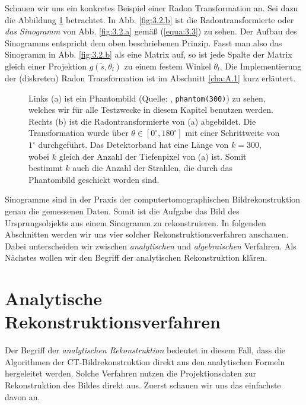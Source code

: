 Schauen wir uns ein konkretes Beispiel einer Radon Transformation an. Sei dazu die Abbildung \ref{fig:3.2} betrachtet. In Abb. \ref{fig:3.2.b} ist die Radontransformierte oder \textit{das Sinogramm} von Abb. \ref{fig:3.2.a} gemäß (\ref{equa:3.3}) zu sehen. Der Aufbau des Sinogramms entspricht dem oben beschriebenen Prinzip. Fasst man also das Sinogramm in Abb. \ref{fig:3.2.b} als eine Matrix auf, so ist jede Spalte der Matrix gleich einer Projektion $g(\tilde{s}, \theta_l)$ zu einem festem Winkel $\theta_l$. Die Implementierung der (diskreten) Radon Transformation ist im Abschnitt \ref{cha:A.1} kurz erläutert.
\begin{figure}[H]
	\begin{center}
	\end{center}
	\caption{ Links (a) ist ein Phantombild (Quelle: \MATLAB, \texttt{\captionstring phantom(300)}) zu sehen, welches wir für alle Testzwecke in diesem Kapitel benutzen werden. Rechts (b) ist die Radontransformierte von (a) abgebildet. Die Transformation wurde über $\theta \in [0^{\circ}, 180^{\circ}]$ mit einer Schrittweite von $1^{\circ}$ durchgeführt. Das Detektorband hat eine Länge von $k = 300$, wobei $k$ gleich der Anzahl der Tiefenpixel von (a) ist. Somit bestimmt $k$ auch die Anzahl der Strahlen, die durch das Phantombild geschickt worden sind.}
	\label{fig:3.2}
\end{figure}

Sinogramme sind in der Praxis der computertomographischen Bildrekonstruktion genau die gemessenen Daten. Somit ist die Aufgabe das Bild des Ursprungsobjekts aus einem Sinogramm zu rekonstruieren. In folgenden Abschnitten werden wir uns vier solcher Rekonstruktionsverfahren anschauen. Dabei unterscheiden wir zwischen \textit{analytischen} und \textit{algebraischen} Verfahren. Als Nächstes wollen wir den Begriff der analytischen Rekonstruktion klären.

\section{Analytische Rekonstruktionsverfahren}
\label{cha:3.1}

Der Begriff der \textit{analytischen Rekonstruktion} bedeutet in diesem Fall, dass die Algorithmen der CT-Bildrekonstruktion direkt aus den analytischen Formeln hergeleitet werden. Solche Verfahren nutzen die Projektionsdaten zur Rekonstruktion des Bildes direkt aus. Zuerst schauen wir uns das einfachste davon an.

